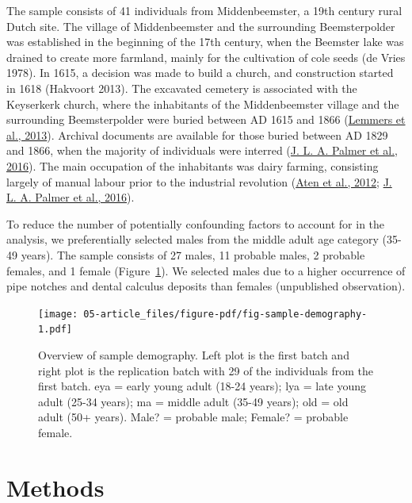 \documentclass[
  letterpaper,
]{book}
\begin{document}
The sample consists of 41 individuals from Middenbeemster, a 19th
century rural Dutch site. The village of Middenbeemster and the
surrounding Beemsterpolder was established in the beginning of the 17th
century, when the Beemster lake was drained to create more farmland,
mainly for the cultivation of cole seeds (de Vries 1978). In 1615, a
decision was made to build a church, and construction started in 1618
(Hakvoort 2013). The excavated cemetery is associated with the
Keyserkerk church, where the inhabitants of the Middenbeemster village
and the surrounding Beemsterpolder were buried between AD 1615 and 1866
(\protect\hyperlink{ref-lemmersMiddenbeemster2013}{Lemmers et al.,
2013}). Archival documents are available for those buried between AD
1829 and 1866, when the majority of individuals were interred
(\protect\hyperlink{ref-palmerActivityReconstruction2016}{J. L. A.
Palmer et al., 2016}). The main occupation of the inhabitants was dairy
farming, consisting largely of manual labour prior to the industrial
revolution (\protect\hyperlink{ref-aten400Jaar2012}{Aten et al., 2012};
\protect\hyperlink{ref-palmerActivityReconstruction2016}{J. L. A. Palmer
et al., 2016}).

To reduce the number of potentially confounding factors to account for
in the analysis, we preferentially selected males from the middle adult
age category (35-49 years). The sample consists of 27 males, 11 probable
males, 2 probable females, and 1 female
(Figure~\ref{fig-sample-demography}). We selected males due to a higher
occurrence of pipe notches and dental calculus deposits than females
(unpublished observation).

\begin{figure}

{\centering \texttt{[image: 05-article\_files/figure-pdf/fig-sample-demography-1.pdf]}

}

\caption{\label{fig-sample-demography}Overview of sample demography.
Left plot is the first batch and right plot is the replication batch
with 29 of the individuals from the first batch. eya = early young adult
(18-24 years); lya = late young adult (25-34 years); ma = middle adult
(35-49 years); old = old adult (50+ years). Male? = probable male;
Female? = probable female.}

\end{figure}

\hypertarget{methods}{%
\section{Methods}\label{methods}}
\end{document}
